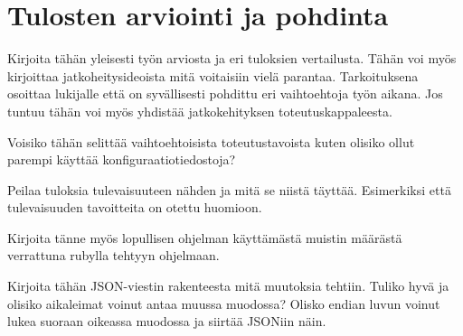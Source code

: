 \chapter{Tulosten arviointi ja pohdinta}
\begin{it}
Kirjoita tähän yleisesti työn arviosta ja eri tuloksien vertailusta. Tähän voi myös kirjoittaa jatkoheitysideoista mitä voitaisiin vielä parantaa. Tarkoituksena osoittaa lukijalle että on syvällisesti pohdittu eri vaihtoehtoja työn aikana. Jos tuntuu tähän voi myös yhdistää jatkokehityksen toteutuskappaleesta.

Voisiko tähän selittää vaihtoehtoisista toteutustavoista kuten olisiko ollut parempi käyttää konfiguraatiotiedostoja?

Peilaa tuloksia tulevaisuuteen nähden ja mitä se niistä täyttää. Esimerkiksi että tulevaisuuden tavoitteita on otettu huomioon.

Kirjoita tänne myös lopullisen ohjelman käyttämästä muistin määrästä verrattuna rubylla tehtyyn ohjelmaan.

Kirjoita tähän JSON-viestin rakenteesta mitä muutoksia tehtiin. Tuliko hyvä ja olisiko aikaleimat voinut antaa muussa muodossa? Olisko endian luvun voinut lukea suoraan oikeassa muodossa ja siirtää JSONiin näin.
\end{it}
